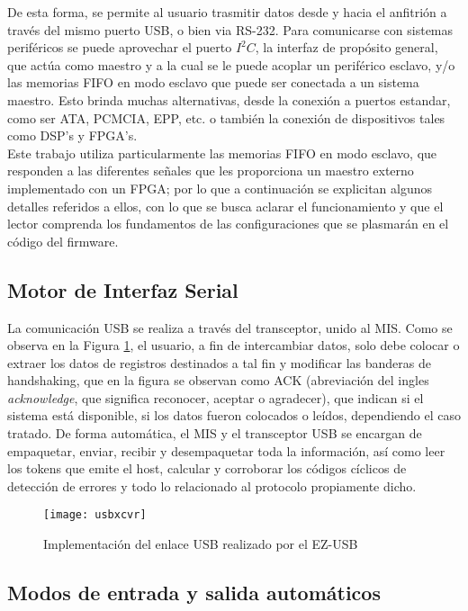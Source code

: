	De esta forma, se permite al usuario trasmitir datos desde y hacia el anfitrión a través del  mismo puerto USB, o bien via RS-232. Para comunicarse con sistemas periféricos se puede aprovechar el puerto $I^2C$, la interfaz de propósito general, que actúa como maestro y a la cual se le puede acoplar un periférico esclavo, y/o las memorias FIFO en modo esclavo que puede ser conectada a un sistema maestro. Esto brinda muchas alternativas, desde la conexión a puertos estandar, como ser ATA, PCMCIA, EPP, etc. o también la conexión de dispositivos tales como DSP's y FPGA's.\\
	
	Este trabajo utiliza particularmente las memorias FIFO en modo esclavo, que responden a las diferentes señales que les proporciona un maestro externo implementado con un FPGA; por lo que a continuación se explicitan algunos detalles referidos a ellos, con lo que se busca aclarar el funcionamiento y que el lector comprenda los fundamentos de las configuraciones que se plasmarán en el código del firmware.\\
	
	\subsection{Motor de Interfaz Serial}
	
		La comunicación USB se realiza a través del transceptor, unido al MIS. Como se observa en la Figura \ref{usbxcvr}, el usuario, a fin de intercambiar datos, solo debe colocar o extraer los datos de registros destinados a tal fin y modificar las banderas de handshaking, que en la figura se observan como ACK (abreviación del ingles {\it acknowledge}, que significa reconocer, aceptar o agradecer), que indican si el sistema está disponible, si los datos fueron colocados o leídos, dependiendo el caso tratado. De forma automática, el MIS y el transceptor USB se encargan de empaquetar, enviar, recibir y desempaquetar toda la información, así como leer los tokens que emite el host, calcular y corroborar los códigos cíclicos de detección de errores y todo lo relacionado al protocolo propiamente dicho.\\
	
		\begin{figure}[hb]
			\centering
			\texttt{[image: usbxcvr]}
			\caption{Implementación del enlace USB realizado por el EZ-USB}
			\label{usbxcvr}
		\end{figure}
	
	\subsection{Modos de entrada y salida automáticos}
	
